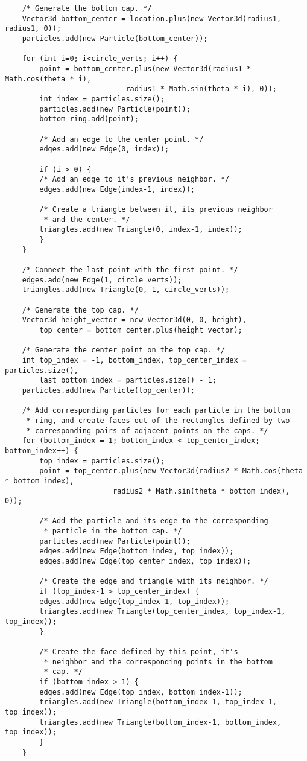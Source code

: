 \begin{lstlisting}
	/* Generate the bottom cap. */
	Vector3d bottom_center = location.plus(new Vector3d(radius1, radius1, 0));
	particles.add(new Particle(bottom_center));

	for (int i=0; i<circle_verts; i++) {
	    point = bottom_center.plus(new Vector3d(radius1 * Math.cos(theta * i),
						    radius1 * Math.sin(theta * i), 0));
	    int index = particles.size();
	    particles.add(new Particle(point));
	    bottom_ring.add(point);

	    /* Add an edge to the center point. */
	    edges.add(new Edge(0, index));

	    if (i > 0) {
		/* Add an edge to it's previous neighbor. */
		edges.add(new Edge(index-1, index));
		
		/* Create a triangle between it, its previous neighbor
		 * and the center. */
		triangles.add(new Triangle(0, index-1, index));
	    }
	}

	/* Connect the last point with the first point. */
	edges.add(new Edge(1, circle_verts));
	triangles.add(new Triangle(0, 1, circle_verts));

	/* Generate the top cap. */
	Vector3d height_vector = new Vector3d(0, 0, height),
	    top_center = bottom_center.plus(height_vector);

	/* Generate the center point on the top cap. */
	int top_index = -1, bottom_index, top_center_index = particles.size(),
	    last_bottom_index = particles.size() - 1;
	particles.add(new Particle(top_center));

	/* Add corresponding particles for each particle in the bottom
	 * ring, and create faces out of the rectangles defined by two
	 * corresponding pairs of adjacent points on the caps. */
	for (bottom_index = 1; bottom_index < top_center_index; bottom_index++) {
	    top_index = particles.size();
	    point = top_center.plus(new Vector3d(radius2 * Math.cos(theta * bottom_index),
						 radius2 * Math.sin(theta * bottom_index), 0));

	    /* Add the particle and its edge to the corresponding
	     * particle in the bottom cap. */
	    particles.add(new Particle(point));
	    edges.add(new Edge(bottom_index, top_index));
	    edges.add(new Edge(top_center_index, top_index));

	    /* Create the edge and triangle with its neighbor. */
	    if (top_index-1 > top_center_index) {
		edges.add(new Edge(top_index-1, top_index));
		triangles.add(new Triangle(top_center_index, top_index-1, top_index));
	    }

	    /* Create the face defined by this point, it's
	     * neighbor and the corresponding points in the bottom
	     * cap. */
	    if (bottom_index > 1) {
		edges.add(new Edge(top_index, bottom_index-1));
		triangles.add(new Triangle(bottom_index-1, top_index-1, top_index));
		triangles.add(new Triangle(bottom_index-1, bottom_index, top_index));
	    }
	}


\end{lstlisting}
